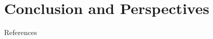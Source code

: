 \documentclass[xcolor=table, 8pt]{beamer}
\begin{document}
%    
%
%    
%
%    
%
%    
%
%    
%
%
%
    \section{Conclusion and Perspectives}
    


    \begin{frame}[allowframebreaks=]{References}
        \printbibliography
    \end{frame}
\end{document}

